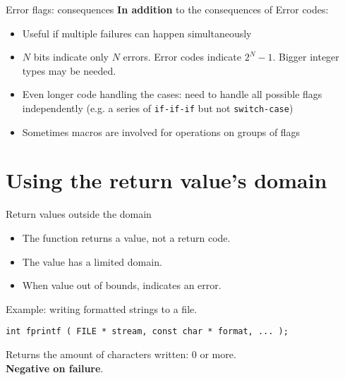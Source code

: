 \documentclass[aspectratio=169,14pt]{beamer}
\begin{document}
\begin{frame}[fragile]{Error flags: consequences}
\textbf{In addition} to the consequences of Error codes:

\begin{itemize}
    \item[\good] Useful if multiple failures can happen simultaneously
    \item[\bad] \(N\) bits indicate only \(N\) errors. Error codes indicate \(2^N - 1\). Bigger integer types may be needed.
    \item[\bad] Even longer code handling the cases: need to handle all possible flags independently (e.g. a series of \texttt{if-if-if} but not \texttt{switch-case})
    \item[\bad] Sometimes macros are involved for operations on groups of flags
\end{itemize}
\end{frame}





\section{Using the return value's domain}

\begin{frame}[fragile]{Return values outside the domain}

\begin{itemize}
    \item The function returns a value, not a return code.
    \item The value has a limited domain.
    \item When value out of bounds, indicates an error.
\end{itemize}

Example: writing formatted strings to a file.

\begin{lstlisting}[style=cstyle]
int fprintf ( FILE * stream, const char * format, ... );
\end{lstlisting}

Returns the amount of characters written: 0 or more.\\
\textbf{Negative on failure}. 
\end{frame}
\end{document}
